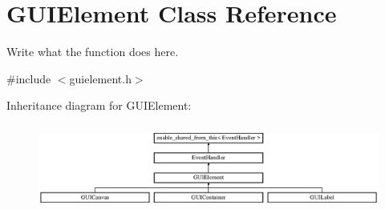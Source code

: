 \hypertarget{classGUIElement}{\section{G\+U\+I\+Element Class Reference}
\label{classGUIElement}
}


Write what the function does here.  




{\ttfamily \#include $<$guielement.\+h$>$}

Inheritance diagram for G\+U\+I\+Element\+:\begin{figure}[H]
\begin{center}
\leavevmode
\includegraphics[height=2.839037cm]{classGUIElement}
\end{center}
\end{figure}
